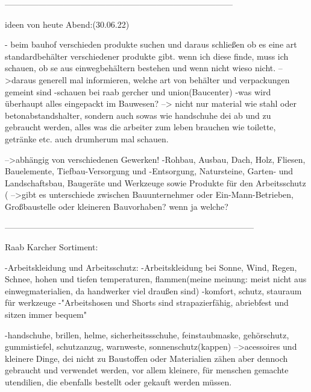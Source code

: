 ---------------------------------------------------------------------------------
    
    ideen von heute Abend:(30.06.22)
        
        - beim bauhof verschieden produkte suchen und daraus schließen ob es eine art standardbehälter verschiedener produkte gibt. wenn ich diese finde, muss ich schauen, ob se aus einwegbehältern bestehen und wenn nicht wieso nicht.
            -->daraus generell mal informieren, welche art von behälter und verpackungen gemeint sind
        -schauen bei raab gercher und union(Baucenter)
        -was wird überhaupt alles eingepackt im Bauwesen?
            --> nicht nur material wie stahl oder betonabstandshalter, sondern auch sowas wie handschuhe dei ab und zu gebraucht werden, alles was die arbeiter zum leben brauchen wie toilette, getränke etc. auch drumherum mal schauen.
            
            -->abhängig von verschiedenen Gewerken!
        -Rohbau, Ausbau, Dach, Holz, Fliesen, Bauelemente, Tiefbau-Versorgung und -Entsorgung, Natursteine, Garten- und Landschaftsbau, Baugeräte und Werkzeuge sowie Produkte für den Arbeitsschutz (%
                                -->gibt es unterschiede zwischen Bauunternehmer oder Ein-Mann-Betrieben, Großbaustelle oder kleineren Bauvorhaben? wenn ja welche?
                            
-----------------------------------------------------------------------------------------

    Raab Karcher Sortiment:
                            
                -Arbeitskleidung und Arbeitsschutz:
                    -Arbeitskleidung bei Sonne, Wind, Regen, Schnee, hohen und tiefen temperaturen, flammen(meine meinung: meist nicht aus einwegmaterialien, da handwerker viel draußen sind)
                    -komfort, schutz, stauraum für werkzeuge
                    -"Arbeitshosen und Shorts sind strapazierfähig, abriebfest und sitzen immer bequem"
                    
                      -handschuhe, brillen, helme, sicherheitssschuhe, feinstaubmaske, gehörschutz, gummistiefel, schutzanzug, warnweste, sonnenschutz(kappen)
                        -->acessoires und kleinere Dinge, dei nicht zu Baustoffen oder Materialien zähen aber dennoch gebraucht und verwendet werden, vor allem kleinere, für menschen gemachte utendilien, die ebenfalls bestellt oder gekauft werden müssen.
                        
